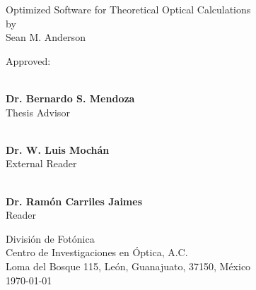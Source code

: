 \begin{titlingpage}

\begin{center}
    \vspace*{1cm}
    {\LARGE Optimized Software for Theoretical Optical Calculations}\\
    \vspace{0.7cm}
    {\large by}\\
    \vspace{0.7cm}
    {\Large Sean M. Anderson}
\end{center}

\vfill
{\Large Approved:}

\begin{flushright}

\vspace*{1cm}

\makebox[0.5\textwidth ]{\hrulefill}\\
\textbf{Dr. Bernardo S. Mendoza}\\ Thesis Advisor
\vspace{1.25cm}

\makebox[0.5\textwidth ]{\hrulefill}\\
\textbf{Dr. W. Luis Moch\'an}\\ External Reader
\vspace{1.25cm}

\makebox[0.5\textwidth ]{\hrulefill}\\
\textbf{Dr. Ram\'on Carriles Jaimes}\\ Reader
\vfill

\end{flushright}

\begin{center}
    {\large 
    Divisi\'on de Fot\'onica\\
    Centro de Investigaciones en \'Optica, A.C.\\
    Loma del Bosque 115, Le\'on, Guanajuato, 37150, M\'exico\\
    \today
    }
\end{center}

\end{titlingpage}
